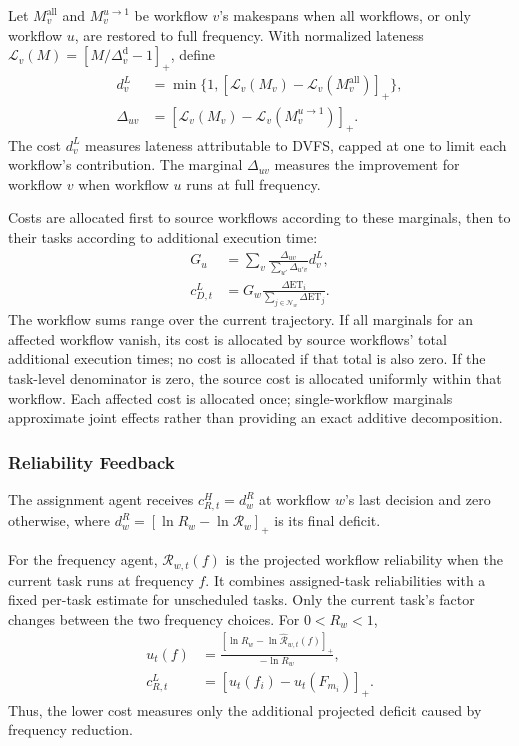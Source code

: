 \documentclass[journal]{IEEEtran}
\begin{document}
Let $M_v^{\mathrm{all}}$ and $M_v^{u\to1}$ be workflow $v$'s makespans when all workflows, or only workflow $u$, are restored to full frequency. With normalized lateness $\mathcal L_v(M)=[M/\Delta_v^{\mathrm d}-1]_+$, define
\begin{align}
    d_v^L&=\min\{1,[\mathcal L_v(M_v)
        -\mathcal L_v(M_v^{\mathrm{all}})]_+\},\nonumber\\
    \Delta_{uv}&=[\mathcal L_v(M_v)
        -\mathcal L_v(M_v^{u\to1})]_+.
    \label{eq:method_counterfactual_marginal}
\end{align}
The cost $d_v^L$ measures lateness attributable to DVFS, capped at one to limit each workflow's contribution. The marginal $\Delta_{uv}$ measures the improvement for workflow $v$ when workflow $u$ runs at full frequency.

Costs are allocated first to source workflows according to these marginals, then to their tasks according to additional execution time:
\begin{align}
    G_u&=\sum_v
        \frac{\Delta_{uv}}{\sum_{u'}\Delta_{u'v}}d_v^L,
        \label{eq:method_source_credit}\\
    c_{D,t}^L&=G_w\frac{\Delta\mathrm{ET}_i}
        {\sum_{j\in\mathcal N_w}\Delta\mathrm{ET}_j}.
        \label{eq:method_low_deadline_credit}
\end{align}
The workflow sums range over the current trajectory. If all marginals for an affected workflow vanish, its cost is allocated by source workflows' total additional execution times; no cost is allocated if that total is also zero. If the task-level denominator is zero, the source cost is allocated uniformly within that workflow. Each affected cost is allocated once; single-workflow marginals approximate joint effects rather than providing an exact additive decomposition.

\subsubsection{Reliability Feedback}

The assignment agent receives $c_{R,t}^H=d_w^R$ at workflow $w$'s last decision and zero otherwise, where $d_w^R=[\ln R_w-\ln\mathcal R_w]_+$ is its final deficit.

For the frequency agent, $\widehat{\mathcal R}_{w,t}(f)$ is the projected workflow reliability when the current task runs at frequency $f$. It combines assigned-task reliabilities with a fixed per-task estimate for unscheduled tasks. Only the current task's factor changes between the two frequency choices. For $0<R_w<1$,
\[
\begin{aligned}
    u_t(f)&=\frac{[\ln R_w-
        \ln\widehat{\mathcal R}_{w,t}(f)]_+}{-\ln R_w},\\
    c_{R,t}^L&=[u_t(f_i)-u_t(F_{m_i})]_+.
\end{aligned}
\]
Thus, the lower cost measures only the additional projected deficit caused by frequency reduction.
\end{document}
